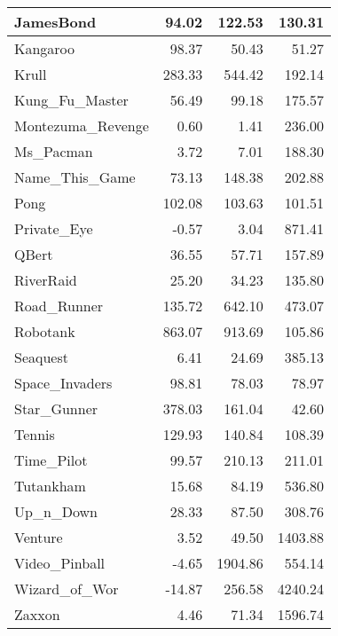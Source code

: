 \begin{table*}[h]
\begin{tabular}{l|r|r|r}
		\hline
		JamesBond & 94.02 & 122.53 & 130.31 \\
		\hline
		Kangaroo & 98.37 & 50.43 & 51.27 \\
		\hline
		Krull & 283.33 & 544.42 & 192.14 \\
		\hline
		Kung\_Fu\_Master & 56.49 & 99.18 & 175.57 \\
		\hline
		Montezuma\_Revenge & 0.60 & 1.41 & 236.00 \\
		\hline
		Ms\_Pacman & 3.72 & 7.01 & 188.30 \\
		\hline
		Name\_This\_Game & 73.13 & 148.38 & 202.88 \\
		\hline
		Pong & 102.08 & 103.63 & 101.51 \\
		\hline
		Private\_Eye & -0.57 & 3.04 & 871.41 \\
		\hline
		QBert & 36.55 & 57.71 & 157.89 \\
		\hline
		RiverRaid & 25.20 & 34.23 & 135.80 \\
		\hline
		Road\_Runner & 135.72 & 642.10 & 473.07 \\
		\hline
		Robotank & 863.07 & 913.69 & 105.86 \\
		\hline
		Seaquest & 6.41 & 24.69 & 385.13 \\
		\hline
		Space\_Invaders & 98.81 & 78.03 & 78.97 \\
		\hline
		Star\_Gunner & 378.03 & 161.04 & 42.60 \\
		\hline
		Tennis & 129.93 & 140.84 & 108.39 \\
		\hline
		Time\_Pilot & 99.57 & 210.13 & 211.01 \\
		\hline
		Tutankham & 15.68 & 84.19 & 536.80 \\
		\hline
		Up\_n\_Down & 28.33 & 87.50 & 308.76 \\
		\hline
		Venture & 3.52 & 49.50 & 1403.88 \\
		\hline
		Video\_Pinball & -4.65 & 1904.86 & 554.14 \\
		\hline
		Wizard\_of\_Wor & -14.87 & 256.58 & 4240.24 \\
		\hline
		Zaxxon & 4.46 & 71.34 & 1596.74 \\
		\hline
	\end{tabular}
\end{table*}

